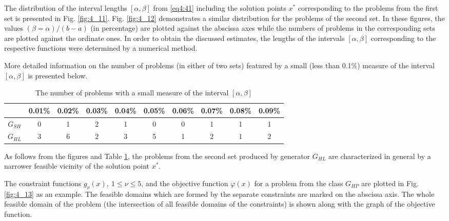 The distribution of the interval lengths $[\alpha,\beta]$ from \eqref{eq4:41} including the solution points $x^*$ corresponding to the problems from the first set is presented in Fig. \ref{fig:4_11}. Fig. \ref{fig:4_12} demonstrates a similar distribution for the problems of the second set. In these figures, the values $(\beta=\alpha)/(b-a)$ (in percentage) are plotted against the abscissa axes while the numbers of problems in the corresponding sets are plotted against the ordinate ones. In order to obtain the discussed estimates, the lengths of the intervals $[\alpha,\beta]$ corresponding to the respective functions were determined by a numerical method.

More detailed information on the number of problems (in either of two sets) featured by a small (less than 0.1\%) measure of the interval $[\alpha,\beta]$ is presented below.

\begin{table}
  \caption{The number of problems with a small measure of the interval $[\alpha,\beta]$}
\begin{center}
  \label{tab4:exp_results2}
  \begin{tabular}{cccccccccc}
    \hline
     & 0.01\% & 0.02\% & 0.03\% & 0.04\% & 0.05\% & 0.06\% & 0.07\% & 0.08\% & 0.09\% \\ \hline
    $G_{SH}$ & 0 & 1 & 2 & 1 & 0 & 0 & 1 & 1 & 1  \\
    $G_{HL}$ & 3 & 6 & 2 & 3 & 5 & 1 & 2 & 1 & 2 \\ \hline
  \end{tabular}
\end{center}
\end{table}

As follows from the figures and Table \ref{tab4:exp_results2}, the problems from the second set produced by generator $G_{HL}$ are characterized in general by a narrower feasible vicinity of the solution point $x^*$.

The constraint functions $g_\nu( x ),\: 1 \le\nu\le 5$, and the objective function $\varphi (x)$ for a problem from the class $G_{HP}$ are plotted in Fig. \ref{fig:4_13} as an example. The feasible domains which are formed by the separate constraints are marked on the abscissa axis. The whole feasible domain of the problem (the intersection of all feasible domains of the constraints) is shown along with the graph of the objective function.

